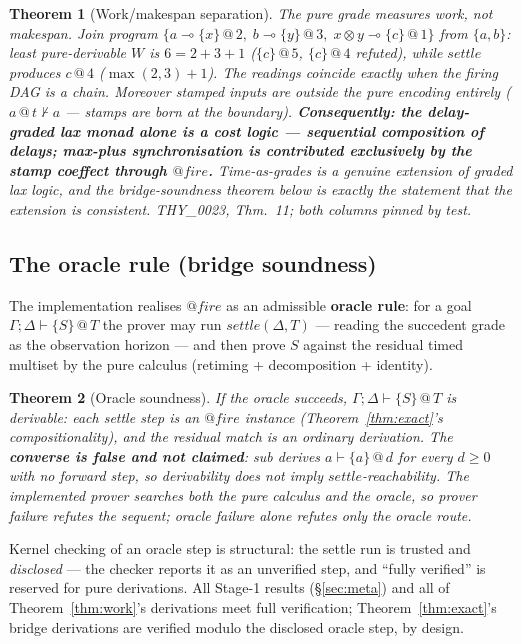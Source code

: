 \documentclass[11pt]{article}
\makeatletter
\newcommand{\lax}[2]{\{#1\}\mathbin{@}#2}       %
\newcommand{\loli}{\multimap}                    %
\newcommand{\tensor}{\otimes}                    %
\newcommand{\stmp}[2]{#1\mathbin{@}#2}           %
\newcommand{\settle}{\mathit{settle}}
\newtheorem{theorem}{Theorem}[section]
\theoremstyle{definition}
\theoremstyle{remark}
\makeatother
\begin{document}
\begin{theorem}[Work/makespan separation]
\label{thm:separation}
The pure grade measures work, not makespan.  Join program
$\{a \loli \lax{x}{2},\; b \loli \lax{y}{3},\; x \tensor y \loli \lax{c}{1}\}$
from $\{a, b\}$: least pure-derivable $W$ is $6 = 2{+}3{+}1$ ($\lax{c}{5}$,
$\lax{c}{4}$ refuted), while $\settle$ produces $\stmp{c}{4}$ ($\max(2,3){+}1$).
The readings coincide exactly when the firing DAG is a chain.  Moreover stamped
inputs are \emph{outside} the pure encoding entirely ($\stmp{a}{t} \not\vdash a$
--- stamps are born at the boundary).  \textbf{Consequently: the delay-graded
lax monad alone is a cost logic --- sequential composition of delays; max-plus
synchronisation is contributed exclusively by the stamp coeffect through
$\mathit{@fire}$.}  Time-as-grades is a genuine extension of graded lax logic,
and the bridge-soundness theorem below is exactly the statement that the
extension is consistent.  THY\_0023, Thm.~11; both columns pinned by test.
\end{theorem}

\subsection{The oracle rule (bridge soundness)}
\label{subsec:oracle}

The implementation realises $\mathit{@fire}$ as an admissible \textbf{oracle
rule}: for a goal $\Gamma; \Delta \vdash \lax{S}{T}$ the prover may run
$\settle(\Delta, T)$ --- reading the succedent grade as the observation horizon
--- and then prove $S$ against the residual timed multiset by the pure calculus
(retiming + decomposition + identity).

\begin{theorem}[Oracle soundness]
\label{thm:oracle}
If the oracle succeeds, $\Gamma; \Delta \vdash \lax{S}{T}$ is derivable: each
settle step is an $\mathit{@fire}$ instance
(Theorem~\ref{thm:exact}'s compositionality), and the residual match is an
ordinary derivation.  The \textbf{converse is false and not claimed}:
\textit{sub} derives $a \vdash \lax{a}{d}$ for every $d \geq 0$ with no forward
step, so derivability does not imply $\settle$-reachability.  The implemented
prover searches both the pure calculus and the oracle, so \emph{prover} failure
refutes the sequent; oracle failure alone refutes only the oracle route.
\end{theorem}

Kernel checking of an oracle step is structural: the settle run is trusted and
\emph{disclosed} --- the checker reports it as an unverified step, and ``fully
verified'' is reserved for pure derivations.  All Stage-1 results (\S\ref{sec:meta})
and all of Theorem~\ref{thm:work}'s derivations meet full verification;
Theorem~\ref{thm:exact}'s bridge derivations are verified modulo the disclosed
oracle step, by design.
\end{document}
